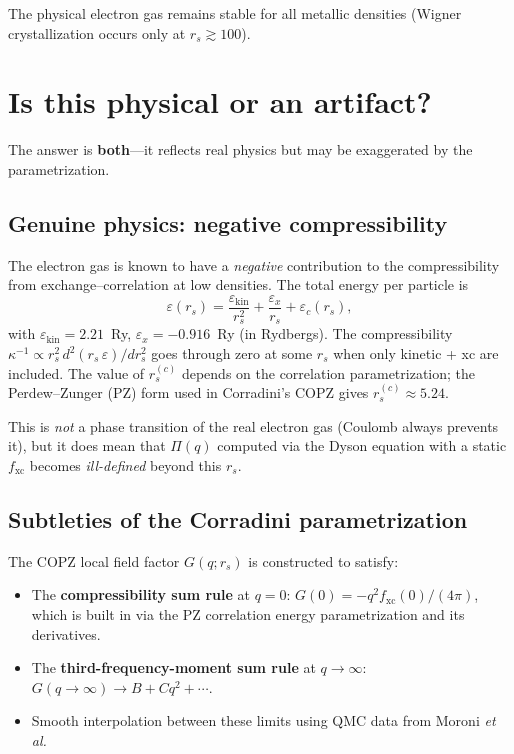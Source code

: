 \documentclass[aps,prb,twocolumn,superscriptaddress,floatfix]{revtex4-2}
\begin{document}
The physical electron gas remains stable for all metallic densities
(Wigner crystallization occurs only at $r_s \gtrsim 100$).

\section{Is this physical or an artifact?}
\label{sec:artifact}

The answer is \textbf{both}---it reflects real physics but may be
exaggerated by the parametrization.

\subsection{Genuine physics: negative compressibility}

The electron gas is known to have a \emph{negative} contribution to the
compressibility from exchange--correlation at low densities.
The total energy per particle is
\begin{equation}
    \varepsilon(r_s) = \frac{\varepsilon_{\text{kin}}}{r_s^2}
    + \frac{\varepsilon_x}{r_s}
    + \varepsilon_c(r_s),
\end{equation}
with $\varepsilon_{\text{kin}} = 2.21$~Ry, $\varepsilon_x = -0.916$~Ry
(in Rydbergs).  The compressibility $\kappa^{-1} \propto r_s^2\,d^2(r_s\,\varepsilon)/dr_s^2$
goes through zero at some $r_s$ when only kinetic + xc are included.
The value of $r_s^{(c)}$ depends on the correlation parametrization;
the Perdew--Zunger (PZ) form used in Corradini's COPZ gives
$r_s^{(c)} \approx 5.24$.

This is \emph{not} a phase transition of the real electron gas
(Coulomb always prevents it), but it does mean that $\Pi(q)$ computed
via the Dyson equation with a static $f_{\mathrm{xc}}$ becomes
\emph{ill-defined} beyond this $r_s$.

\subsection{Subtleties of the Corradini parametrization}

The COPZ local field factor $G(q; r_s)$ is constructed to satisfy:
\begin{itemize}
    \item The \textbf{compressibility sum rule} at $q = 0$:
          $G(0) = -q^2 f_{\mathrm{xc}}(0) / (4\pi)$, which is built in via the
          PZ correlation energy parametrization and its derivatives.
    \item The \textbf{third-frequency-moment sum rule} at $q \to \infty$:
          $G(q \to \infty) \to B + C q^2 + \cdots$.
    \item Smooth interpolation between these limits using QMC data from
          Moroni \emph{et al.}
\end{itemize}
\end{document}
